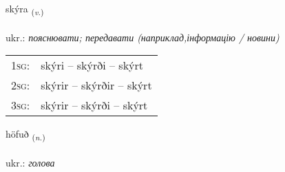 \documentclass[frontgrid, backgrid]{flacards}\usepackage[]{graphicx}\usepackage[]{xcolor}
\begin{document}
\renewcommand{\flhead}{\vskip5pt \fboxsep=0pt {\small\bfseries\footnotesize Sagnorð | дієслово}}
\renewcommand{\fcfoot}{\vskip5pt \fboxsep=0pt \hspace{2pt}{\small\bfseries\footnotesize 1K}}

\renewcommand{\blhead}{\vskip5pt {\small\bfseries\footnotesize Sagnorð | дієслово }}
\renewcommand{\bcfoot}{\vskip5pt \hspace{2pt}{\small\bfseries\footnotesize 1K}}


{skýra \small{\textsubscript{(\textit{v.})}} \\[1ex] %
\textphonetic{[sciːra]} \\
ukr.: \emph{пояснювати; передавати (наприклад,інформацію / новини)} \\  [2ex]
\renewcommand*{\arraystretch}{0.8}
\begin{tabular}{p{1cm}l}
\textsc{1sg}: & skýri -- skýrði -- skýrt \\ 
\textsc{2sg}: & skýrir -- skýrðir -- skýrt \\ 
\textsc{3sg}: & skýrir -- skýrði -- skýrt \\ 
\end{tabular}
}

\renewcommand{\flhead}{\vskip5pt \fboxsep=0pt {\small\bfseries\footnotesize Nafnorð | іменник}}
\renewcommand{\fcfoot}{\vskip5pt \fboxsep=0pt \hspace{2pt}{\small\bfseries\footnotesize 1K}}

\renewcommand{\blhead}{\vskip5pt {\small\bfseries\footnotesize Nafnorð | іменник }}
\renewcommand{\bcfoot}{\vskip5pt \hspace{2pt}{\small\bfseries\footnotesize 1K}}


{höfuð \small{\textsubscript{(\textit{n.})}} \\[1ex] %
\textphonetic{[hœːvʏð]} \\
ukr.: \emph{голова} \\  [2ex]
\renewcommand*{\arraystretch}{0.8}
}
\end{document}
